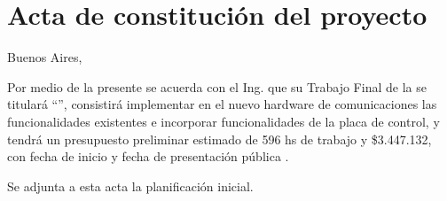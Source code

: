 \documentclass[
11pt, %
codirector, %
]{charter}
\begin{document}
\section*{Acta de constitución del proyecto}
\label{sec:acta}

\begin{flushright}
	Buenos Aires, \fechaInicioName
\end{flushright}

\vspace{2cm}

Por medio de la presente se acuerda con el Ing. \authorname\hspace{1px} que su Trabajo Final de la \degreename\hspace{1px} se titulará ``\ttitle'', consistirá implementar en el nuevo hardware de comunicaciones las funcionalidades existentes e incorporar funcionalidades de la placa de control, y tendrá un presupuesto preliminar estimado de 596 hs de trabajo y \$3.447.132, con fecha de inicio \fechaInicioName\hspace{1px} y fecha de presentación pública \fechaFinalName.

Se adjunta a esta acta la planificación inicial.

\vfill
\end{document}
